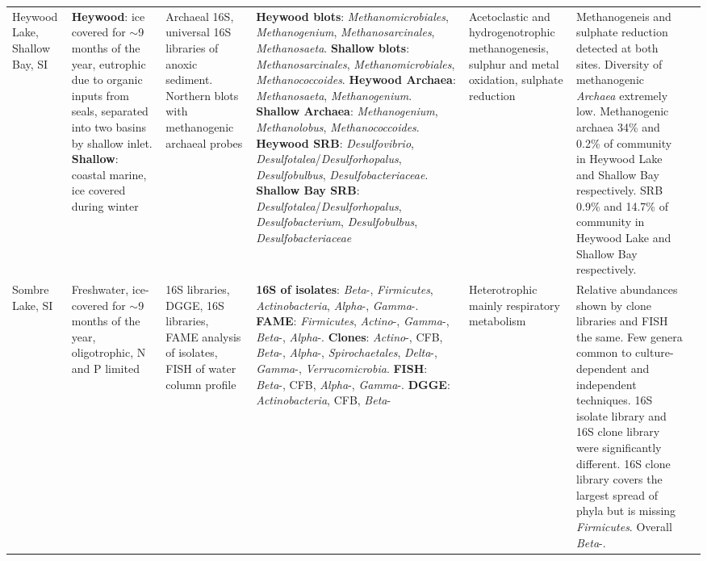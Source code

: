\begin{landscape}
\begin{longtable}{p{2.5cm}p{3.5cm}p{2cm}p{3cm}p{2.5cm}p{5.5cm}p{3.5cm}}
Heywood Lake, Shallow Bay, SI & \textbf{Heywood}: ice covered for $\sim$9 months of the year, eutrophic due to organic inputs from seals, separated into two basins by shallow inlet. \textbf{Shallow}: coastal marine, ice covered during winter & Archaeal 16S, universal 16S libraries of anoxic sediment. Northern blots with methanogenic archaeal probes & \textbf{Heywood blots}: \emph{Methanomicrobiales}, \emph{Methanogenium}, \emph{Methanosarcinales}, \emph{Methanosaeta}. \textbf{Shallow blots}: \emph{Methanosarcinales}, \emph{Methanomicrobiales}, \emph{Methanococcoides}. \textbf{Heywood Archaea}: \emph{Methanosaeta}, \emph{Methanogenium}. \textbf{Shallow Archaea}: \emph{Methanogenium}, \emph{Methanolobus}, \emph{Methanococcoides}. \textbf{Heywood SRB}: \emph{Desulfovibrio}, \emph{Desulfotalea}/\emph{Desulforhopalus}, \emph{Desulfobulbus}, \emph{Desulfobacteriaceae}. \textbf{Shallow Bay SRB}: \emph{Desulfotalea}/\emph{Desulforhopalus}, \emph{Desulfobacterium}, \emph{Desulfobulbus}, \emph{Desulfobacteriaceae} & Acetoclastic and hydrogenotrophic methanogenesis, sulphur and metal oxidation, sulphate reduction & Methanogeneis and sulphate reduction detected at both sites. Diversity of methanogenic \emph{Archaea} extremely low. Methanogenic archaea 34\% and 0.2\% of community in Heywood Lake and Shallow Bay respectively. SRB 0.9\% and 14.7\% of community in Heywood Lake and Shallow Bay respectively. & \cite{Purdy2003}  \\

Sombre Lake, SI & Freshwater, ice-covered for $\sim$9 months of the year, oligotrophic, N and P limited & 16S libraries, DGGE, 16S libraries, FAME analysis of isolates, FISH of water column profile & \textbf{16S of isolates}: \emph{Beta}-, \emph{Firmicutes}, \emph{Actinobacteria}, \emph{Alpha}-, \emph{Gamma}-. \textbf{FAME}: \emph{Firmicutes}, \emph{Actino}-, \emph{Gamma}-, \emph{Beta}-, \emph{Alpha}-. \textbf{Clones}: \emph{Actino}-, CFB, \emph{Beta}-, \emph{Alpha}-, \emph{Spirochaetales}, \emph{Delta}-, \emph{Gamma}-, \emph{Verrucomicrobia}. \textbf{FISH}: \emph{Beta}-, CFB, \emph{Alpha}-, \emph{Gamma}-. \textbf{DGGE}: \emph{Actinobacteria}, CFB, \emph{Beta}- & Heterotrophic mainly respiratory metabolism & Relative abundances shown by clone libraries and FISH the same. Few genera common to culture-dependent and independent techniques. 16S isolate library and 16S clone library were significantly different. 16S clone library covers the largest spread of phyla but is missing \emph{Firmicutes}. Overall \emph{Beta}-. & \cite{Pearce2003a}  \\


\end{longtable}
\end{landscape}
